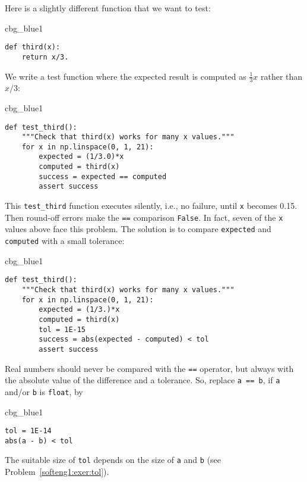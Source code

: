 \documentclass[graybox,sectrefs,envcountresetchap,open=right,final]{svmonodo}
\newenvironment{_cod_tight}[1]{
   \def\FrameCommand{\colorbox{#1}}
   \FrameRule0.6pt\MakeFramed {\FrameRestore}\vskip3mm}
   {\vskip0mm\endMakeFramed}
\newenvironment{cod}[1]{
\bgroup\rmfamily
\fboxsep=0mm\relax
\begin{_cod_tight}{#1}
\list{}{\parsep=-2mm\parskip=0mm\topsep=0pt\leftmargin=2mm
\rightmargin=2\leftmargin\leftmargin=4pt\relax}
\item\relax}
{\endlist\end{_cod_tight}\egroup}
\newenvironment{notice_mdfboxadmon}[1][]{
\begin{notice_mdfboxmdframed}[frametitle=#1]
}
{
\end{notice_mdfboxmdframed}
}
\begin{document}
Here is a slightly different function that
we want to test:

\begin{cod}{cbg_blue1}\begin{Verbatim}[numbers=none,fontsize=\fontsize{9pt}{9pt},baselinestretch=0.95,xleftmargin=2mm]
def third(x):
    return x/3.
\end{Verbatim}
\end{cod}
\noindent
We write a test function where the expected result is computed as
$\frac{1}{3}x$ rather than $x/3$:

\begin{cod}{cbg_blue1}\begin{Verbatim}[numbers=none,fontsize=\fontsize{9pt}{9pt},baselinestretch=0.95,xleftmargin=2mm]
def test_third():
    """Check that third(x) works for many x values."""
    for x in np.linspace(0, 1, 21):
        expected = (1/3.0)*x
        computed = third(x)
        success = expected == computed
        assert success
\end{Verbatim}
\end{cod}
\noindent
This \Verb!test_third! function executes silently, i.e., no failure,
until \texttt{x} becomes 0.15. Then round-off errors make the \texttt{==} comparison
\texttt{False}. In fact, seven of the \texttt{x} values above face this problem.
The solution is to compare \texttt{expected} and \texttt{computed}
with a small tolerance:

\begin{cod}{cbg_blue1}\begin{Verbatim}[numbers=none,fontsize=\fontsize{9pt}{9pt},baselinestretch=0.95,xleftmargin=2mm]
def test_third():
    """Check that third(x) works for many x values."""
    for x in np.linspace(0, 1, 21):
        expected = (1/3.)*x
        computed = third(x)
        tol = 1E-15
        success = abs(expected - computed) < tol
        assert success
\end{Verbatim}
\end{cod}
\noindent


\begin{notice_mdfboxadmon}
Real numbers should never be compared with the \texttt{==} operator, but always
with the absolute value of the difference and a tolerance.
So, replace \texttt{a == b}, if \texttt{a} and/or \texttt{b} is \texttt{float}, by

\begin{cod}{cbg_blue1}\begin{Verbatim}[numbers=none,fontsize=\fontsize{9pt}{9pt},baselinestretch=0.95,xleftmargin=2mm]
tol = 1E-14
abs(a - b) < tol
\end{Verbatim}
\end{cod}
\noindent
The suitable size of \texttt{tol} depends on the size of \texttt{a} and \texttt{b}
(see Problem~\ref{softeng1:exer:tol}).
\end{notice_mdfboxadmon}
\end{document}
